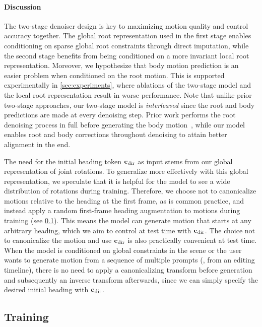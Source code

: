 \paragraph{Discussion}
The two-stage denoiser design is key to maximizing motion quality and control accuracy together. 
The global root representation used in the first stage enables conditioning on sparse global root constraints through direct imputation, while the second stage benefits from being conditioned on a more invariant local root representation.
Moreover, we hypothesize that body motion prediction is an easier problem when conditioned on the root motion. 
This is supported experimentally in \cref{sec:experiments}, where ablations of the two-stage model and the local root representation result in worse performance. 
Note that unlike prior two-stage approaches, our two-stage model is \emph{interleaved} since the root and body predictions are made at every denoising step. Prior work performs the root denoising process in full before generating the body motion~\cite{karunratanakul2023gmd,hwang2025motion}, while our model enables root and body corrections throughout denoising to attain better alignment in the end. 

The need for the initial heading token $\mathbf{c}_\text{dir}$ as input stems from our global representation of joint rotations. 
To generalize more effectively with this global representation, we speculate that it is helpful for the model to see a wide distribution of rotations during training. Therefore, we choose not to canonicalize motions relative to the heading at the first frame, as is common practice, and instead apply a random first-frame heading augmentation to motions during training (see \cref{sec:method:training}). 
This means the model can generate motion that starts at any arbitrary heading, which we aim to control at test time with $\mathbf{c}_\text{dir}$. 
The choice not to canonicalize the motion and use $\mathbf{c}_\text{dir}$ is also practically convenient at test time. When the model is conditioned on global constraints in the scene or the user wants to generate motion from a sequence of multiple prompts (\eg, from an editing timeline), there is no need to apply a canonicalizing transform before generation and subsequently an inverse transform afterwards, since we can simply specify the desired initial heading with $\mathbf{c}_\text{dir}$.



\subsection{Training}
\label{sec:method:training}

